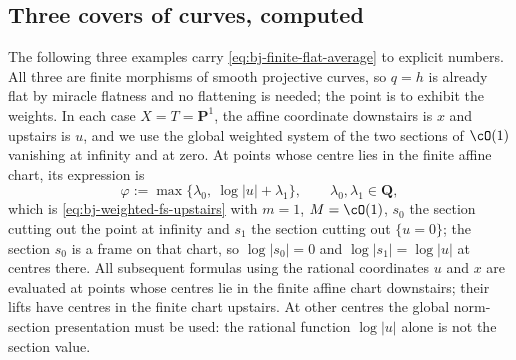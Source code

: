 \subsection{Three covers of curves, computed}
\label{sec:ch41-averaging-examples}

The following three examples carry
\eqref{eq:bj-finite-flat-average} to explicit numbers.  All three are
finite morphisms of smooth projective curves, so $q=h$ is already flat by
miracle flatness and no flattening is needed; the point is to exhibit the
weights.  In each case $X=T=\mathbf P^1$, the affine coordinate
downstairs is $x$ and upstairs is $u$, and we use the global weighted system of the two sections of
$\cO(1)$ vanishing at infinity and at zero.  At points whose centre
lies in the finite affine chart, its expression is
\[
 \varphi:=\max\{\lambda_0,\ \log|u|+\lambda_1\},
 \qquad
 \lambda_0,\lambda_1\in\mathbf Q,
\tag{41.35}\label{eq:ch41-example-data}
\]
which is \eqref{eq:bj-weighted-fs-upstairs} with $m=1$, $M=\cO(1)$,
$s_0$ the section cutting out the point at infinity and $s_1$ the
section cutting out $\{u=0\}$; the section $s_0$ is a frame on that chart, so
$\log|s_0|=0$ and $\log|s_1|=\log|u|$ at centres there.
All subsequent formulas using the rational coordinates $u$ and $x$
are evaluated at points whose centres lie in the finite affine chart
downstairs; their lifts have centres in the finite chart upstairs.
At other centres the global norm-section presentation must be used:
the rational function $\log|u|$ alone is not the section value.

